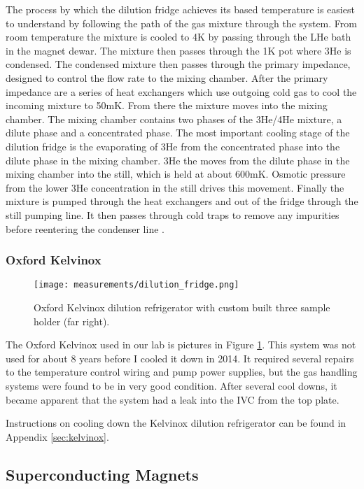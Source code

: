 The process by which the dilution fridge achieves its based temperature is easiest to understand by following the path of the gas mixture through the system. From room temperature the mixture is cooled to 4K by passing through the LHe bath in the magnet dewar. The mixture then passes through the 1K pot where 3He is condensed. The condensed mixture then passes through the primary impedance, designed to control the flow rate to the mixing chamber. After the primary impedance are a series of heat exchangers which use outgoing cold gas to cool the incoming mixture to 50mK. From there the mixture moves into the mixing chamber. The mixing chamber contains two phases of the 3He/4He mixture, a dilute phase and a concentrated phase. The most important cooling stage of the dilution fridge is the evaporating of 3He from the concentrated phase into the dilute phase in the mixing chamber. 3He the moves from the dilute phase in the mixing chamber into the still, which is held at about 600mK. Osmotic pressure from the lower 3He concentration in the still drives this movement. Finally the mixture is pumped through the heat exchangers and out of the fridge through the still pumping line. It then passes through cold traps to remove any impurities before reentering the condenser line \cite{Balshaw2001}.

\subsubsection*{Oxford Kelvinox}

\begin{figure}
    \centering
    \texttt{[image: measurements/dilution\_fridge.png]}
    \caption{Oxford Kelvinox dilution refrigerator with custom built three sample holder (far right).}
    \label{fig:kelvinox}
\end{figure}

The Oxford Kelvinox used in our lab is pictures in Figure \ref{fig:kelvinox}. This system was not used for about 8 years before I cooled it down in 2014. It required several repairs to the temperature control wiring and pump power supplies, but the gas handling systems were found to be in very good condition. After several cool downs, it became apparent that the system had a leak into the IVC from the top plate. 

Instructions on cooling down the Kelvinox dilution refrigerator can be found in Appendix \ref{sec:kelvinox}.

\subsection{Superconducting Magnets}

